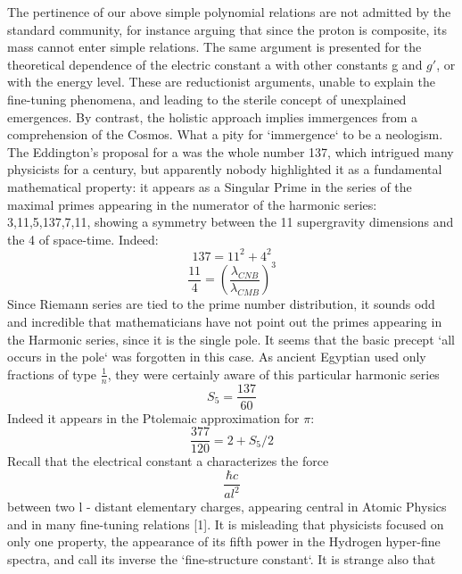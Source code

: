 \documentclass[twoside,draft]{article}
\begin{document}
{The pertinence of our above simple polynomial relations are not admitted by the standard
community, for instance arguing that since the proton is composite, its mass cannot enter simple
relations. The same argument is presented for the theoretical dependence of the electric constant a
with other constants g and $g\prime$, or with the energy level. These are reductionist arguments, unable to explain the fine-tuning phenomena, and leading to the sterile concept of unexplained emergences.
By contrast, the holistic approach implies immergences from a comprehension of the Cosmos. What a
pity for `immergence` to be a neologism.
The Eddington's proposal for a was the whole number 137, which intrigued many physicists for a
century, but apparently nobody highlighted it as a fundamental mathematical property: it appears as a
Singular Prime in the series of the maximal primes appearing in the numerator of the harmonic
series: 3,11,5,137,7,11, showing a symmetry between the 11 supergravity dimensions and the 4 of
space-time. Indeed:
\begin{equation}
137 = 11^{2} + 4^{2}
\end{equation}
\begin{equation}
\frac{11}{4} = (\frac{\lambda_{CNB}}{\lambda_{CMB}})^{3}
\end{equation}
Since Riemann series are tied to the prime number distribution, it sounds odd and incredible that mathematicians
have not point out the primes appearing in the Harmonic series, since it is the single pole. It seems
that the basic precept `all occurs in the pole` was forgotten in this case. As ancient Egyptian used
only fractions of type $\frac{1}{n}$, they were certainly aware of this particular harmonic series 
\begin{equation}
S_{5} = \frac{137}{60}
\end{equation}
Indeed it appears in the Ptolemaic approximation for $\pi$: 
\begin{equation}
\frac{377}{120} = 2 + S_{5}/2
\end{equation}
Recall that the electrical constant a characterizes the force 
\begin{equation}
\frac{\hbar c}{al^{2}}
\end{equation} between two l - distant
elementary charges, appearing central in Atomic Physics and in many fine-tuning relations [1]. It is
misleading that physicists focused on only one property, the appearance of its fifth power in the
Hydrogen hyper-fine spectra, and call its inverse the `fine-structure constant`. It is strange also that
}
\end{document}

